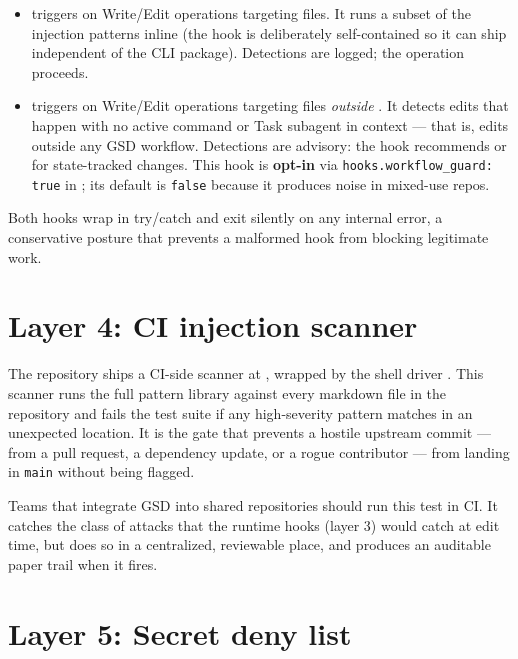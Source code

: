 \documentclass[11pt,letterpaper,openany]{book}
\begin{document}
\begin{itemize}[leftmargin=1.2em]
  \item {} triggers on Write/Edit operations targeting  files. It runs a subset of the  injection patterns inline (the hook is deliberately self-contained so it can ship independent of the CLI package). Detections are logged; the operation proceeds.
  \item {} triggers on Write/Edit operations targeting files \emph{outside} . It detects edits that happen with no active \gsdcmd{*} command or Task subagent in context — that is, edits outside any GSD workflow. Detections are advisory: the hook recommends  or  for state-tracked changes. This hook is \textbf{opt-in} via \texttt{hooks.workflow\_guard: true} in ; its default is \texttt{false} because it produces noise in mixed-use repos.
\end{itemize}

Both hooks wrap in try/catch and exit silently on any internal error, a conservative posture that prevents a malformed hook from blocking legitimate work.

\section{Layer 4: CI injection scanner}

The repository ships a CI-side scanner at , wrapped by the shell driver . This scanner runs the full  pattern library against every markdown file in the repository and fails the test suite if any high-severity pattern matches in an unexpected location. It is the gate that prevents a hostile upstream commit — from a pull request, a dependency update, or a rogue contributor — from landing in \texttt{main} without being flagged.

Teams that integrate GSD into shared repositories should run this test in CI. It catches the class of attacks that the runtime hooks (layer 3) would catch at edit time, but does so in a centralized, reviewable place, and produces an auditable paper trail when it fires.

\section{Layer 5: Secret deny list}
\end{document}
